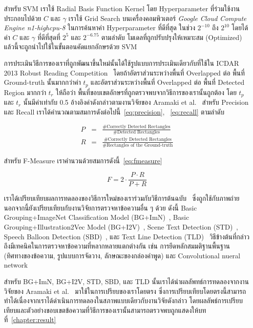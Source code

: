 สำหรับ SVM เราใช้ Radial Basis Function Kernel โดย Hyperparameter ที่ร่วมใช้งานประกอบไปด้วย $C$ และ $\gamma$ เราใช้ Grid Search บนเครื่องคอมพิวเตอร์ \textit{Google Cloud Compute Engine n1-highcpu-8} ในการค้นหาค่า Hyperparameter ที่ดีที่สุด ในช่วง $2^{-10}$ ถึง $2^{10}$ โดยได้ค่า $C$ และ $\gamma$ ที่ดีที่สุดที่ $2^5$ และ $2^{-6.75}$ ตามลำดับ โมเดลที่ถูกปรับปรุงให้เหมาะสม (Optimized) แล้วนี้จะถูกนำไปใช้ในขั้นตอนคัดแยกอักษรด้วย SVM

การประเมินวิธีการของเราที่ถูกพัฒนาขึ้นใหม่นั้นได้ใช้รูปแบบการประเมินเดียวกับที่ใช้ใน ICDAR 2013 Robust Reading Competition~\cite{6628859} โดยถ้าอัตราส่วนระหว่างพื้นที่ Overlapped ต่อ พื้นที่ Ground-truth นั้นมากกว่าค่า $t_p$  และอัตราส่วนระหว่างพื้นที่ Overlapped ต่อ พื้นที่ Detected Region มากกว่า $t_r$ ให้ถือว่า พื้นที่ขอบเขตอักษรที่ถูกตรวจพบจากวิธีการของเรานั้นถูกต้อง โดย $t_p$ และ $t_r$ นั้นมีค่าเท่ากับ 0.5 อ้างอิงค่าดังกล่าวตามงานวิจัยของ Aramaki et al.~\cite{7532890} สำหรับ Precision และ Recall เราได้คำนวณตามสมการดังต่อไปนี้~\ref{eq:precision}, ~\ref{eq:recall} ตามลำดับ

\begin{eqnarray}
    P&=& \frac{\text{\#Correctly Detected Rectangles}}{\text{\#Detected Rectangles}}\label{eq:precision}\\
    R&=& \frac{\text{\#Correctly Detected Rectangles}}{\text{\#Rectangles of the Ground-truth}}\label{eq:recall}
\end{eqnarray}

สำหรับ F-Measure เราคำนวนด้วยสมการดังนี้~\ref{eq:fmeasure}

\begin{equation}
    F = 2\cdot\frac{P \cdot R}{P+R}
    \label{eq:fmeasure}
\end{equation}

เราได้เปรียบเทียบผลการทดลองของวิธีการใหม่ของเราร่วมกับวิธีการต้นฉบับ~\cite{Suykens1999} ซึ่งถูกใช้กับภาพถ่าย นอกจากนี้ยังเปรียบเทียบกับงานวิจัยการตรวจหาข้อความอื่น ๆ ด้วย ดังนี้ Basic Grouping+ImageNet Classification Model (BG+ImN)~\cite{7532890}, Basic Grouping+Illustration2Vec Model (BG+I2V)~\cite{7532890}, Scene Text Detection (STD)~\cite{6628665}, Speech Balloon Detection (SBD)~\cite{6761596}, และ Text Line Detection (TLD)~\cite{rigaud:hal-00841492} วิธีข้างต้นที่กล่าวถึงมีเทคนิคในการตรวจหาข้อความที่หลากหลายแตกต่างกัน เช่น การยึดหลักสมมติฐานพื้นฐาน (ทิศทางของข้อความ, รูปแบบการจัดวาง, ลักษณะของกล่องคำพูด) และ Convolutional nueral network 

สำหรับ BG+ImN, BG+I2V, STD, SBD, และ TLD นั้นเราได้นำผลลัพทธ์การทดลองจากงานวิจัยของ Aramaki et al.~\cite{7532890} มาใช้ในการเปรียบของเราโดยตรง ซึ่งการเปรียบเทียบโดยตรงนี้สามารถทำได้เนื่องจากเราได้ดำเนินการทดลองในสภาพแบบเดียวกับงานวิจัยดังกล่าว โดยผลลัพธ์การเปรียบเทียบและตัวอย่างขอบเขตข้อความที่วิธีการของเรานั้นสามารถตรวจพบถูกแสดงให้บทที่~\ref{chapter:result}
